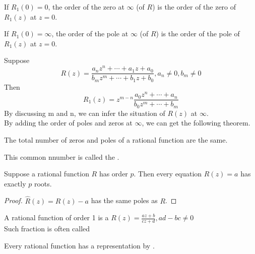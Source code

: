 If  $ R_1(0)=0  $, the  order of the zero at  $ \infty $ (of  $ R  $) is the order of the zero of  $ R_1(z)  $ at  $ z=0 $.

If  $ R_1(0)=\infty $, the order of the pole at  $ \infty $ (of $ R $) is the order of the pole of  $ R_1(z) $ at  $ z=0 $.

Suppose
\[R(z)=\frac{a_nz^n+\cdots+a_1z+a_0}{b_mz^m+\cdots+b_1z+b_0},a_n\not=0,b_m\not=0\]
Then \[R_1(z)=z^{m-n}\frac{a_0z^n+\cdots+a_n }{b_0z^m+\cdots+b_m}\]
By discussing m and n, we can infer  the situation of  $ R(z)  $ at $ \infty $.\\
By adding the order of poles and zeros at  $ \infty  $, we can get the following theorem.
\begin{theorem}
    The total number of zeros and poles of a rational function are the same.
\end{theorem}
\begin{remark}
    This common nnumber is called the .
\end{remark}
\begin{corollary}
    Suppose a rational function  $ R  $ has order  $ p  $. Then every equation  $ R(z)=a  $ has exactly  $ p  $ roots.
\end{corollary}
\begin{proof}
     $ \hat{R}(z)=R(z)-a $ has the same poles as  $ R  $.
\end{proof}
A rational function of order 1 is a   $ R(z)=\frac{az+b }{cz+d }, ad-bc\not=0  $\\
Such fraction is often called 

Every rational function has a representation by .

